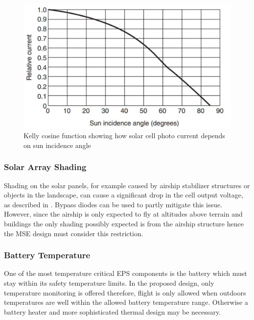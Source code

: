 \begin{figure}[H]
\centering
\includegraphics[scale=0.4]{figures/fig_KellyCosine}
\caption[Kelly cosine function]{Kelly cosine function showing how solar cell photo current depends on sun incidence angle\cite[Fig 9.12]{book:mukund_wind}}
\label{fig:KellyCosine}
\end{figure}
%
%
\subsubsection*{Solar Array Shading}
Shading on the solar panels, for example caused by airship stabilizer structures or objects in the landscape, can cause a significant drop in the cell output voltage, as described in \cite[p. 165]{Mukund}. Bypass diodes can be used to partly mitigate this issue. However, since the airship is only expected to fly at altitudes above terrain and buildings the only shading possibly expected is from the airship structure hence the \ac{MSE} design must consider this restriction.
%
\subsubsection*{Battery Temperature}
One of the most temperature critical \ac{EPS} components is the battery which must stay within its safety temperature limits. In the proposed design, only temperature monitoring is offered therefore, flight is only allowed when outdoors temperatures are well within the allowed battery temperature range. Otherwise a battery heater and more sophisticated thermal design may be necessary.
%
